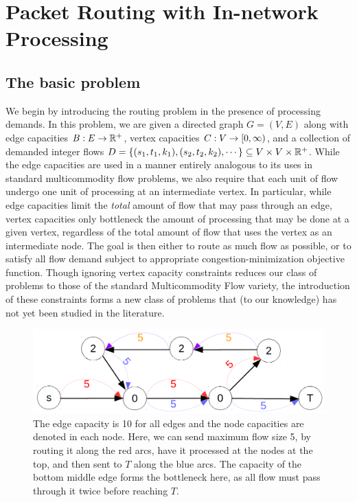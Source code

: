 \section{Packet Routing with In-network Processing}
\label{sec:routing}
\subsection{The basic problem}
\label{subsec:basicproblem}
We begin by introducing the routing problem in the presence of processing demands. In this problem, we are given a directed graph $G = (V,E)$ along with edge capacities $B : E \rightarrow \mathbb{R}^+$, vertex capacities $C : V \rightarrow {{\ensuremath{[0,\infty)}}}$, and a collection of demanded integer flows $D = \{(s_1, t_1, k_1), (s_2, t_2, k_2), \cdots\} \subseteq V \times V \times \mathbb{R}^+$. While the edge capacities are used in a manner entirely analogous to its uses in standard multicommodity flow problems, we also require that each unit of flow undergo one unit of processing at an intermediate vertex. In particular, while edge capacities limit the \textit{total} amount of flow that may pass through an edge, vertex capacities only bottleneck the amount of processing that may be done at a given vertex, regardless of the total amount of flow that uses the vertex as an intermediate node. The goal is then either to route as much flow as possible, or to satisfy all flow demand subject to appropriate congestion-minimization objective function. Though ignoring vertex capacity constraints reduces our class of problems to those of the standard Multicommodity Flow variety, the introduction of these constraints forms a new class of problems that (to our knowledge) has not yet been studied in the literature.

\begin{figure}
\centering
  \includegraphics[width=0.7\linewidth]{images/demo2.pdf}
 \caption{The edge capacity is 10 for all edges and the node capacities are denoted in each node. Here, we can send maximum flow size 5, by routing it along the red arcs, have it processed at the nodes at the top, and then sent to $T$ along the blue arcs. The capacity of the bottom middle edge forms the bottleneck here, as all flow must pass through it twice before reaching $T$.}
\end{figure}


